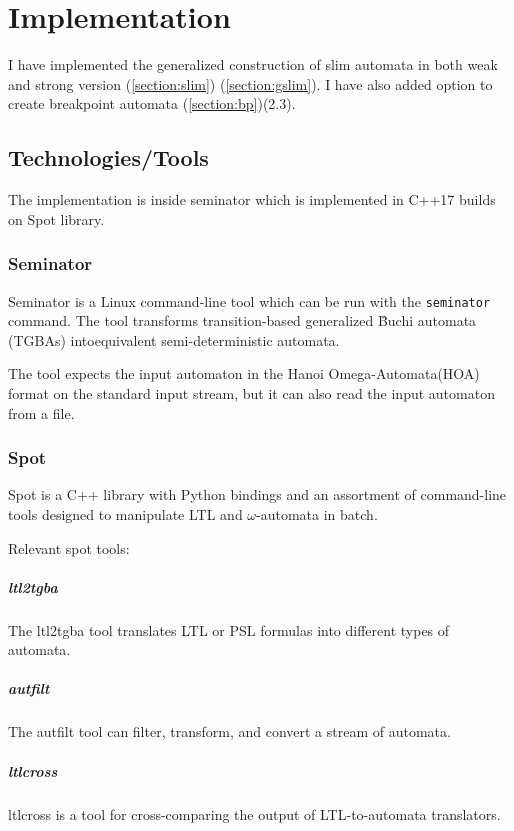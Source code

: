 \documentclass[
	digital
nolof, nolot
]{fithesis3}
\begin{document}
			
	\chapter{Implementation}
		I have implemented the generalized construction of slim automata in both weak and strong version  (\ref{section:slim}) (\ref{section:gslim}). I have also added option to create breakpoint automata (\ref{section:bp})(2.3).
		
		\section{Technologies/Tools}
		The implementation is inside seminator which is implemented in C++17 builds on Spot library. %
		\subsection{Seminator} 
		Seminator is a Linux command-line tool which can be run with the \texttt{seminator} command. The tool transforms transition-based generalized B̈uchi automata (TGBAs) intoequivalent semi-deterministic automata. \cite{blahoudek.20.cav}
		
		
		
		The tool expects the input automaton in the Hanoi Omega-Automata(HOA) format \cite{DBLP:conf/cav/BabiakBDKKM0S15} on the standard input stream, but it can also read the input automaton from a file.
		
	\subsection{Spot}
	Spot is a C++ library with Python bindings and an assortment of command-line tools designed to manipulate LTL and $\omega$-automata in batch. \cite{spot2}
	
	Relevant spot tools:
	\paragraph{ltl2tgba} The ltl2tgba tool translates LTL or PSL formulas into different types of automata. \cite{ltl2tgba}
	\paragraph{autfilt} The autfilt tool can filter, transform, and convert a stream of automata. \cite{autfilt}
	\paragraph{ltlcross} ltlcross is a tool for cross-comparing the output of LTL-to-automata translators. \cite{ltlcross}
\end{document}
